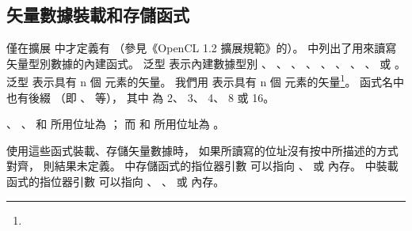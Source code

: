 \subsection[section:vectorLsFunc]{矢量數據裝載和存儲函式}

\startbuffer
僅在擴展  中才定義有 %
（參見《OpenCL 1.2 擴展規範》的{}）。
\stopbuffer
{}中列出了用來讀寫矢量型別數據的內建函式。
泛型  表示內建數據型別
 、 、 、 、
 、 、 、 、
  或 。
泛型  表示具有 n 個  元素的矢量。
我們用  表示具有 n 個  元素的矢量\footnote{\getbuffer}。
函式名中也有後綴  （即 、  等），
其中  為 2、 3、 4、 8 或 16。

\startnotepar
{}、 、  和 
所用位址為 ；
而  和 
所用位址為 。
\stopnotepar

{}

使用這些函式裝載、存儲矢量數據時，
如果所讀寫的位址沒有按中所描述的方式對齊，
則結果未定義。
中存儲函式的指位器引數  可以指向
 、  或  內存。
中裝載函式的指位器引數  可以指向
 、 、  或  內存。

